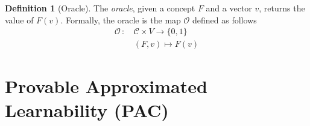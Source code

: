 \documentclass[a4paper,11pt]{article}
\theoremstyle{definition}
\newtheorem{defn}{Definition}
\newcommand{\CC}{\mathcal{C}}
\newcommand{\PP}{\mathcal{P}}
\begin{document}
\begin{defn}[Oracle]
  The \textit{oracle}, given a concept $F$ and a vector $v$, returns the value
  of $F(v)$. Formally, the oracle is the map $\mathcal{O}$ defined as follows
  \begin{equation}
    \begin{aligned}
      \mathcal{O}\,:\, &\CC\times V \to \{0,1\}\\
      & \left( F,v \right) \mapsto F(v)
    \end{aligned}
    \label{oracle}
  \end{equation}
\end{defn}
\section{Provable Approximated Learnability (PAC)}
%
\end{document}

